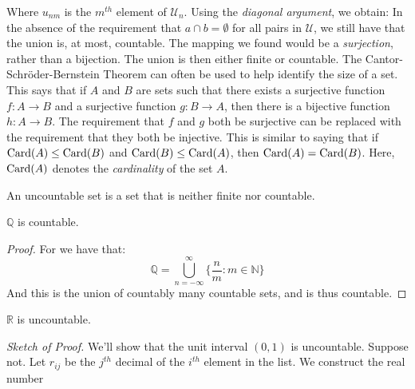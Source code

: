             Where $u_{nm}$ is the $m^{th}$ element of
            $\mathcal{U}_{n}$.
            Using the \textit{diagonal argument},
            we obtain:
            In the absence of the requirement that
            $a\cap{b}=\emptyset$ for all pairs in $\mathcal{U}$,
            we still have that the union is, at most, countable.
            The mapping we found would be a
            \textit{surjection}, rather than a bijection.
            The union is then either finite or countable. The
            Cantor-Schr\"{o}der-Bernstein Theorem can often be
            used to help identify the size of a set. This says
            that if $A$ and $B$ are sets such that there exists
            a surjective function $f:A\rightarrow{B}$ and a
            surjective function $g:B\rightarrow{A}$, then there
            is a bijective function $h:A\rightarrow{B}$. The
            requirement that $f$ and $g$ both be surjective
            can be replaced with the requirement that they both
            be injective. This is similar to saying that if
            $\operatorname{Card}(A)\leq\operatorname{Card}(B)$ and $\operatorname{Card}(B)\leq\operatorname{Card}(A)$,
            then $\operatorname{Card}(A)=\operatorname{Card}(B)$. Here, $\operatorname{Card}(A)$ denotes
            the \textit{cardinality} of the set $A$.
            \begin{definition}
                An uncountable set is a set that is
                neither finite nor countable.
            \end{definition}
            \begin{theorem}
                $\mathbb{Q}$ is countable.
            \end{theorem}
            \begin{proof}
                For we have that:
                \begin{equation}
                    \mathbb{Q}=
                    \bigcup_{n=-\infty}^{\infty}
                    \Big\{\frac{n}{m}:m\in\mathbb{N}\Big\}
                \end{equation}
                And this is the union of countably
                many countable sets, and is thus countable.
            \end{proof}
            \begin{theorem}
                $\mathbb{R}$ is uncountable.
            \end{theorem}
            \textit{Sketch of Proof.} We'll show that the unit
            interval $(0,1)$ is uncountable. Suppose not.
            Let $r_{ij}$ be the $j^{th}$ decimal of the $i^{th}$
            element in the list. We construct the real number
